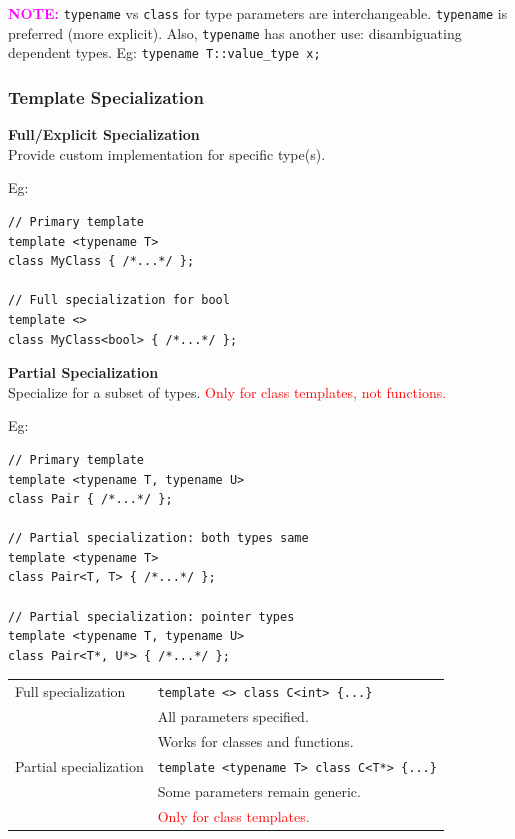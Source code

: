 \begin{mdframed}[nobreak=true,backgroundcolor=magenta!10,linecolor=magenta]
\textcolor{magenta}{\textbf{NOTE:}} \texttt{typename} vs \texttt{class} for type parameters are interchangeable. \texttt{typename} is preferred (more explicit). Also, \texttt{typename} has another use: disambiguating dependent types. Eg: \texttt{typename T::value\_type x;}
\end{mdframed}

\subsubsection{Template Specialization}

\textbf{Full/Explicit Specialization}\\
Provide custom implementation for specific type(s).

Eg:
\begin{mdframed}[nobreak=true,backgroundcolor=gray!10,linecolor=Firebrick4]
\begin{verbatim}
// Primary template
template <typename T>
class MyClass { /*...*/ };

// Full specialization for bool
template <>
class MyClass<bool> { /*...*/ };
\end{verbatim}
\end{mdframed}

\textbf{Partial Specialization}\\
Specialize for a subset of types. \textcolor{red}{Only for class templates, not functions.}

Eg:
\begin{mdframed}[nobreak=true,backgroundcolor=gray!10,linecolor=Firebrick4]
\begin{verbatim}
// Primary template
template <typename T, typename U>
class Pair { /*...*/ };

// Partial specialization: both types same
template <typename T>
class Pair<T, T> { /*...*/ };

// Partial specialization: pointer types
template <typename T, typename U>
class Pair<T*, U*> { /*...*/ };
\end{verbatim}
\end{mdframed}

\begin{tabularx}{\linewidth}{lX}
    \hline
    Full specialization & \texttt{template <> class C<int> \{...\}}\\
                        & All parameters specified.\\
                        & Works for classes and functions.\\
    \hline
    Partial specialization & \texttt{template <typename T> class C<T*> \{...\}}\\
                           & Some parameters remain generic.\\
                           & \textcolor{red}{Only for class templates.}\\
    \hline
\end{tabularx}

